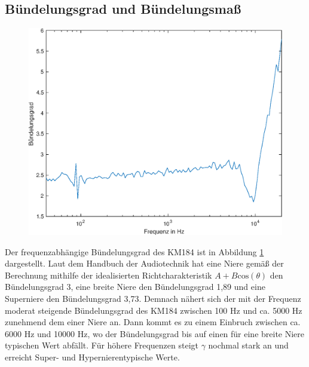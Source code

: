 \subsection{Bündelungsgrad und Bündelungsmaß}
\label{subsec:e}
\begin{figure}
    \centering
    \includegraphics[width=0.95\linewidth]{Figures/Buendelungsgrad}
    \label{fig:buendel}
\end{figure}
Der frequenzabhängige Bündelungsgrad des KM184 ist in Abbildung \ref{fig:buendel} dargestellt.
Laut dem Handbuch der Audiotechnik \cite{Weinzierl08} hat eine Niere gemäß der Berechnung mithilfe der idealisierten Richtcharakteristik $A + B \mathrm{cos}(\theta)$ den Bündelungsgrad 3, eine breite Niere den Bündelungsgrad 1,89 und eine Superniere den Bündelungsgrad 3,73.
Demnach nähert sich der mit der Frequenz moderat steigende Bündelungsgrad des KM184 zwischen 100 Hz und ca. 5000 Hz zunehmend dem einer Niere an.
Dann kommt es zu einem Einbruch zwischen ca. 6000 Hz und 10000 Hz, wo der Bündelungsgrad bis auf einen für eine breite Niere typischen Wert abfällt. 
Für höhere Frequenzen steigt $\gamma$ nochmal stark an und erreicht  Super- und Hypernierentypische Werte.
